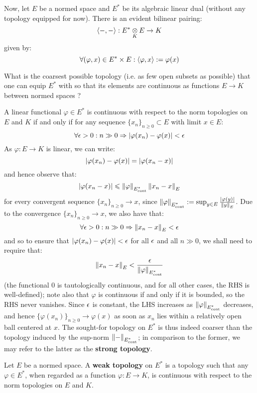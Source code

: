         Now, let $E$ be a normed space and $E^*$ be its algebraic linear dual (without any topology equipped for now). There is an evident bilinear pairing:
            $$\<-, -\>: E^* \tensor_K E \to K$$
        given by:
            $$\forall (\varphi, x) \in E^* \x E: \<\varphi, x\> := \varphi(x)$$
        \begin{question}
            What is the coarsest possible topology (i.e. as few open subsets as possible) that one can equip $E^*$ with so that its elements are continuous as functions $E \to K$ between normed spaces ?
        \end{question}
        A linear functional $\varphi \in E^*$ is continuous with respect to the norm topologies on $E$ and $K$ if and only if for any sequence $\{x_n\}_{n \geq 0} \subset E$ with limit $x \in E$:
            $$\forall \epsilon > 0: n \gg 0 \Rightarrow \left\lvert { \varphi(x_n) - \varphi(x) } \right\rvert < \epsilon$$
        As $\varphi: E \to K$ is linear, we can write:
            $$\left\lvert { \varphi(x_n) - \varphi(x) } \right\rvert = \left\lvert {\varphi(x_n - x)} \right\rvert$$
        and hence observe that:
            $$\left\lvert {\varphi(x_n - x)} \right\rvert \leqslant \left\| {\varphi} \right\|_{E^*_{\mathrm{cont}}} \left\| {x_n - x} \right\|_E$$
        for every convergent sequence $\{x_n\}_{n \geq 0} \to x$, since $\left\| {\varphi} \right\|_{E^*_{\mathrm{cont}}} := \sup_{y \in E} \frac{\left\lvert {\varphi(y)} \right\rvert}{\left\| {y} \right\|_E}$. Due to the convergence $\{x_n\}_{n \geq 0} \to x$, we also have that:
            $$\forall \epsilon > 0: n \gg 0 \Rightarrow \left\| {x_n - x} \right\|_E < \epsilon$$
        and so to ensure that $\left\lvert {\varphi(x_n) - \varphi(x)} \right\rvert < \epsilon$ for all $\epsilon$ and all $n \gg 0$, we shall need to require that:
            $$\left\| {x_n - x} \right\|_E < \frac{\epsilon}{\left\| {\varphi} \right\|_{E^*_{\mathrm{cont}}}}$$
        (the functional $0$ is tautologically continuous, and for all other cases, the RHS is well-defined); note also that $\varphi$ is continuous if and only if it is bounded, so the RHS never vanishes. Since $\epsilon$ is constant, the LHS increases as $\left\| {\varphi} \right\|_{E^*_{\mathrm{cont}}}$ decreases, and hence $\{\varphi(x_n)\}_{n \geq 0} \to \varphi(x)$ as soon as $x_n$ lies within a relatively  open ball centered at $x$. The sought-for topology on $E^*$ is thus indeed coarser than the topology induced by the sup-norm $\left\| {-} \right\|_{E^*_{\mathrm{cont}}}$; in comparison to the former, we may refer to the latter as the \textbf{strong topology}.
        \begin{definition} \label{def: weak_topologies}
            Let $E$ be a normed space. A \textbf{weak topology} on $E^*$ is a topology such that any $\varphi \in E^*$, when regarded as a function $\varphi: E \to K$, is continuous with respect to the norm topologies on $E$ and $K$.
        \end{definition}
